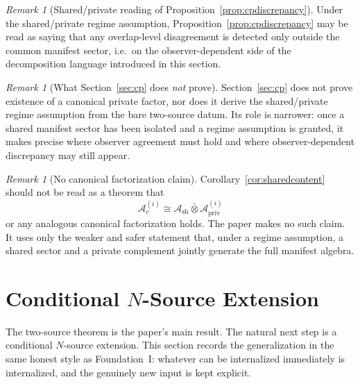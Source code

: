 \documentclass[12pt]{article}
\theoremstyle{definition}
\theoremstyle{remark}
\newtheorem{remark}[theorem]{Remark}
\begin{document}
\begin{remark}[Shared/private reading of Proposition~\ref{prop:cpdiscrepancy}]
Under the shared/private regime assumption, Proposition~\ref{prop:cpdiscrepancy}
may be read as saying that any overlap-level disagreement is detected
only outside the common manifest sector, i.e.\ on the observer-dependent
side of the decomposition language introduced in this section.
\end{remark}

\begin{remark}[What Section~\ref{sec:cp} does \emph{not} prove]
Section~\ref{sec:cp} does not prove existence of a canonical private
factor, nor does it derive the shared/private regime assumption from the
bare two-source datum. Its role is narrower: once a shared manifest
sector has been isolated and a regime assumption is granted, it makes
precise where observer agreement must hold and where observer-dependent
discrepancy may still appear.
\end{remark}

\begin{remark}[No canonical factorization claim]
Corollary~\ref{cor:sharedcontent} should not be read as a theorem that
\[
\mathcal A_c^{(i)}
\cong
\mathcal A_{\mathrm{sh}}\bar\otimes
\mathcal A_{\mathrm{priv}}^{(i)}
\]
or any analogous canonical factorization holds. The paper makes no such
claim. It uses only the weaker and safer statement that, under a regime
assumption, a shared sector and a private complement jointly generate
the full manifest algebra.
\end{remark}

\section{Conditional \texorpdfstring{$N$}{N}-Source Extension}\label{sec:nsource}

The two-source theorem is the paper's main result. The natural next step
is a conditional \(N\)-source extension. This section records the
generalization in the same honest style as Foundation~I: whatever can be
internalized immediately is internalized, and the genuinely new input is
kept explicit.
\end{document}
